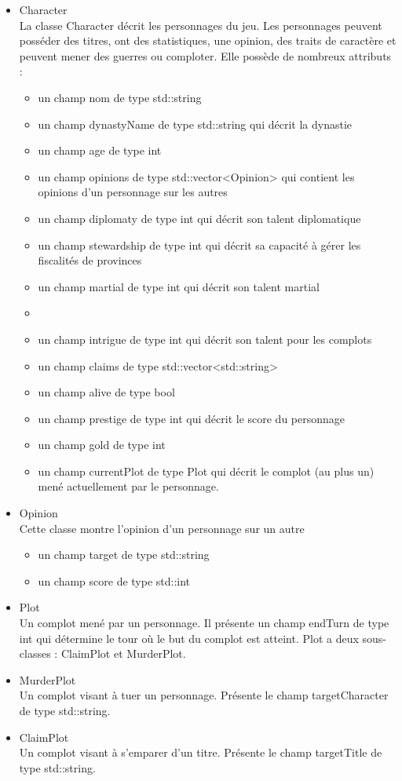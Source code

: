 \documentclass[a4paper,12pt]{article}
\begin{document}
\begin{itemize}
\item Character\\
La classe Character décrit les personnages du jeu. Les personnages peuvent posséder des titres, ont des statistiques, une opinion, des traits de caractère et peuvent mener des guerres ou comploter. Elle possède de nombreux attributs :
\begin{itemize}
\item un champ nom de type std::string
\item un champ dynastyName de type std::string qui décrit la dynastie
\item un champ age de type int
\item un champ opinions de type std::vector<Opinion> qui contient les opinions d'un personnage sur les autres
\item un champ diplomaty de type int qui décrit son talent diplomatique
\item un champ stewardship de type int qui décrit sa capacité à gérer les fiscalités de provinces
\item un champ martial de type int qui décrit son talent martial
\item \item un champ intrigue de type int qui décrit son talent pour les complots
\item un champ claims de type std::vector<std::string>
\item un champ alive de type bool
\item un champ prestige de type int qui décrit le score du personnage
\item un champ gold de type int
\item un champ currentPlot de type Plot qui décrit le complot (au plus un) mené actuellement par le personnage.
\end{itemize}
\item Opinion\\
Cette classe montre l'opinion d'un personnage sur un autre
\begin{itemize}
\item un champ target de type std::string
\item un champ score de type std::int
\end{itemize}
\item Plot\\
Un complot mené par un personnage. Il présente un champ endTurn de type int qui détermine le tour où le but du complot est atteint. Plot a deux sous-classes : ClaimPlot et MurderPlot.
\item MurderPlot\\
Un complot visant à tuer un personnage. Présente le champ targetCharacter de type std::string.
\item ClaimPlot\\
Un complot visant à s'emparer d'un titre. Présente le champ targetTitle de type std::string.


\end{itemize}
\end{document}
